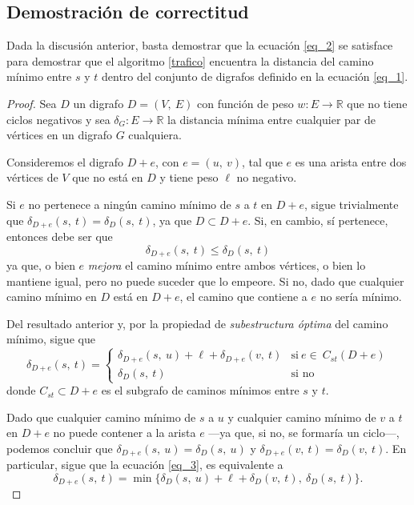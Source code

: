 \subsection{Demostración de correctitud}\label{correctitud}  

Dada la discusión anterior, basta demostrar que la ecuación \ref{eq_2} se satisface para demostrar que el algoritmo \ref{trafico} encuentra la distancia del camino mínimo entre $s$ y $t$ dentro del conjunto de digrafos definido en la ecuación \ref{eq_1}.

\begin{proof} 
    Sea $D$ un digrafo $D = (V,\ E)$ con función de peso $w: E \to \mathbb{R}$ que no tiene ciclos negativos y sea  $\delta_G : E \to \mathbb{R}$ la distancia mínima entre cualquier par de vértices en un digrafo $G$ cualquiera.

    Consideremos el digrafo $D+e$, con $e = (u,\ v)$, tal que $e$ es una arista entre dos vértices de $V$ que no está en $D$ y tiene peso $\ell$ no negativo. 
    
    Si $e$ no pertenece a ningún camino mínimo de $s$ a $t$ en $D + e$, sigue trivialmente que $\delta_{D + e}(s,\ t) = \delta_{D}(s,\ t)$, ya que $D \subset D + e$. Si, en cambio, sí pertenece, entonces debe ser que
    \begin{equation*}
        \delta_{D + e}(s,\ t) \leq \delta_{D}(s,\ t)
    \end{equation*} 
    ya que, o bien $e$ \textit{mejora} el camino mínimo entre ambos vértices, o bien lo mantiene igual, pero no puede suceder que lo empeore. Si no, dado que cualquier camino mínimo en $D$ está en $D + e$, el camino que contiene a $e$ no sería mínimo. 
    
    Del resultado anterior y, por la propiedad de \textit{subestructura óptima} del camino mínimo, sigue que
    \begin{equation}\label{eq_3}
        \delta_{D + e}(s,\ t) = \begin{cases}
            \delta_{D + e}(s,\ u) + \ell + \delta_{D + e}(v,\ t) &\text{si}\ e \in\ C_{st}(D+e)\\
            \delta_{D}(s,\ t) &\text{si no}
        \end{cases}
    \end{equation}
    donde $C_{st} \subset D + e$ es el subgrafo de caminos mínimos entre $s$ y $t$.

    Dado que cualquier camino mínimo de $s$ a $u$ y cualquier camino mínimo de $v$ a $t$ en $D + e$ no puede contener a la arista $e$ ---ya que, si no, se formaría un ciclo---, podemos concluir que $ \delta_{D + e}(s,\ u) = \delta_{D}(s,\ u) $ y $ \delta_{D + e}(v,\ t) = \delta_{D}(v,\ t)$. En particular, sigue que la ecuación \ref{eq_3}, es equivalente a
    \begin{equation*}
        \delta_{D + e}(s,\ t) = \min\{\delta_{D}(s,\ u) + \ell + \delta_{D}(v,\ t),\ \delta_{D}(s,\ t)\}.
    \end{equation*}
\end{proof}
    
